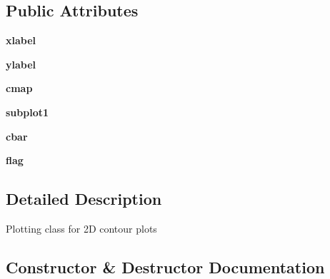 \subsection*{Public Attributes}
\begin{DoxyCompactItemize}
\item 
\hypertarget{class_uni_dec_1_1unidec__modules_1_1plot2d_1_1_plot2d_a50e6ccaeb5eee9ff14fcb808206c44e0}{}{\bfseries xlabel}\label{class_uni_dec_1_1unidec__modules_1_1plot2d_1_1_plot2d_a50e6ccaeb5eee9ff14fcb808206c44e0}

\item 
\hypertarget{class_uni_dec_1_1unidec__modules_1_1plot2d_1_1_plot2d_ab95199f24b946fb1d83fd1cf340b4714}{}{\bfseries ylabel}\label{class_uni_dec_1_1unidec__modules_1_1plot2d_1_1_plot2d_ab95199f24b946fb1d83fd1cf340b4714}

\item 
\hypertarget{class_uni_dec_1_1unidec__modules_1_1plot2d_1_1_plot2d_ada1d29662069c476cc7a9f02cdfc8bc8}{}{\bfseries cmap}\label{class_uni_dec_1_1unidec__modules_1_1plot2d_1_1_plot2d_ada1d29662069c476cc7a9f02cdfc8bc8}

\item 
\hypertarget{class_uni_dec_1_1unidec__modules_1_1plot2d_1_1_plot2d_a808449ffc4e5b0f28d284461832703bc}{}{\bfseries subplot1}\label{class_uni_dec_1_1unidec__modules_1_1plot2d_1_1_plot2d_a808449ffc4e5b0f28d284461832703bc}

\item 
\hypertarget{class_uni_dec_1_1unidec__modules_1_1plot2d_1_1_plot2d_aae30b2754664594456a74e40d9eaebcd}{}{\bfseries cbar}\label{class_uni_dec_1_1unidec__modules_1_1plot2d_1_1_plot2d_aae30b2754664594456a74e40d9eaebcd}

\item 
\hypertarget{class_uni_dec_1_1unidec__modules_1_1plot2d_1_1_plot2d_ac9b0a8d19a535c37ee986b0dbd8705b3}{}{\bfseries flag}\label{class_uni_dec_1_1unidec__modules_1_1plot2d_1_1_plot2d_ac9b0a8d19a535c37ee986b0dbd8705b3}

\end{DoxyCompactItemize}


\subsection{Detailed Description}
\begin{DoxyVerb}Plotting class for 2D contour plots
\end{DoxyVerb}
 

\subsection{Constructor \& Destructor Documentation}
\hypertarget{class_uni_dec_1_1unidec__modules_1_1plot2d_1_1_plot2d_ac66b98ae8813e973ed3d018bf6d81fd4}{}

